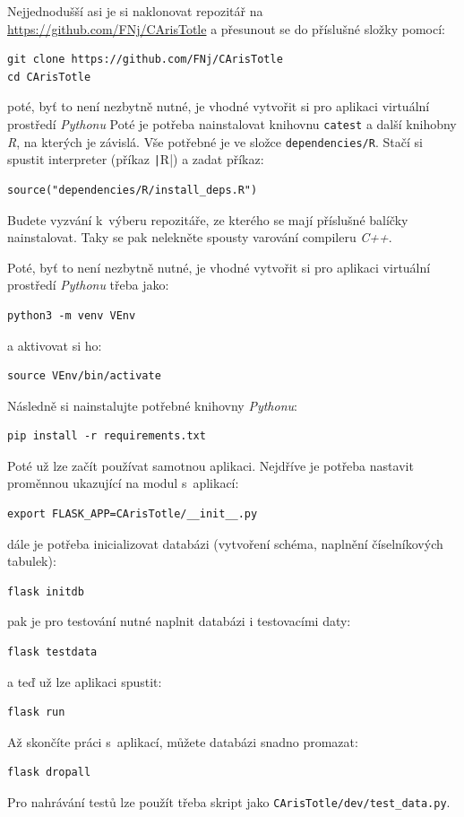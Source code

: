 \documentclass[a4paper,twoside,12pt]{scrbook}
\begin{document}
Nejjednodušší asi je si naklonovat repozitář na \url{https://github.com/FNj/CArisTotle} a přesunout se do příslušné složky pomocí:
\begin{verbatim}
git clone https://github.com/FNj/CArisTotle
cd CArisTotle
\end{verbatim}
poté, byť to není nezbytně nutné, je vhodné vytvořit si pro aplikaci virtuální prostředí \textit{Pythonu}
Poté je potřeba nainstalovat knihovnu \texttt{catest} a další knihobny \textit{R}, na kterých je závislá. Vše potřebné je ve složce \texttt{dependencies/R}. Stačí si spustit interpreter (příkaz \texttt|R|) a zadat příkaz:
\begin{verbatim}
source("dependencies/R/install_deps.R")
\end{verbatim}
Budete vyzvání k~výberu repozitáře, ze kterého se mají příslušné balíčky nainstalovat. Taky se pak nelekněte spousty varování compileru \textit{C++}.

Poté, byť to není nezbytně nutné, je vhodné vytvořit si pro aplikaci virtuální prostředí \textit{Pythonu} třeba jako:
\begin{verbatim}
python3 -m venv VEnv
\end{verbatim}
a aktivovat si ho:
\begin{verbatim}
source VEnv/bin/activate
\end{verbatim}

Následně si nainstalujte potřebné knihovny \textit{Pythonu}:
\begin{verbatim}
pip install -r requirements.txt
\end{verbatim}

Poté už lze začít používat samotnou aplikaci. Nejdříve je potřeba nastavit proměnnou ukazující na modul s~aplikací:
\begin{verbatim}
export FLASK_APP=CArisTotle/__init__.py
\end{verbatim}
dále je potřeba inicializovat databázi (vytvoření schéma, naplnění číselníkových tabulek):
\begin{verbatim}
flask initdb
\end{verbatim}
pak je pro testování nutné naplnit databázi i testovacími daty:
\begin{verbatim}
flask testdata
\end{verbatim}
a teď už lze aplikaci spustit:
\begin{verbatim}
flask run
\end{verbatim}

Až skončíte práci s~aplikací, můžete databázi snadno promazat:
\begin{verbatim}
flask dropall
\end{verbatim}

Pro nahrávání testů lze použít třeba skript jako \texttt{CArisTotle/dev/test\_data.py}.
\end{document}
